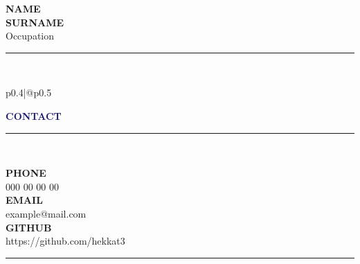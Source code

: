 \documentclass[12pt,a4paper]{article}
\newcommand{\myname}[1]{\textbf{\Huge\selectfont\MakeUppercase{#1}}\\}
\newcommand{\myjobtitle}[1]{{\large #1}\\}
\newcommand{\myline}[1]{\rule{#1}{1.0pt}\\}
\newcommand{\topic}[1]{\textcolor{MidnightBlue}{\textbf{\Large\selectfont\MakeUppercase{#1}}\\\vspace{-0.5cm}\myline{1.0cm}}}
\newcommand{\uppersubtopicnnl}[1]{\textcolor{MidnightBlue!50}{\textbf{\normalsize\selectfont\MakeUppercase{#1}}}} %
\newcommand{\uppersubtopic}[1]{\uppersubtopicnnl{#1}\\}
\begin{document}
\begin{flushleft}
  \myname{NAME} %
  \myname{SURNAME} %
  \myjobtitle{Occupation} %
  \textcolor{CornflowerBlue}{\rule{\linewidth}{1pt}}\\
\end{flushleft}

\vspace{-1.25cm} %
\begin{multicols}{2}
\setlength{\arrayrulewidth}{1pt} %

\noindent\begin{tabular}{p{0.4\textwidth}|@{\hspace{5mm}}p{0.5\textwidth}}

{
\begin{flushleft}
\topic{contact}
\uppersubtopic{phone}
000 00 00 00\\
\uppersubtopic{email}
example@mail.com\\
\uppersubtopic{github}
https://github.com/hekkat3\\

\textcolor{CornflowerBlue}{\rule{\linewidth}{0.5pt}}\\


\end{flushleft}}
\end{tabular}
\end{multicols}
\end{document}
